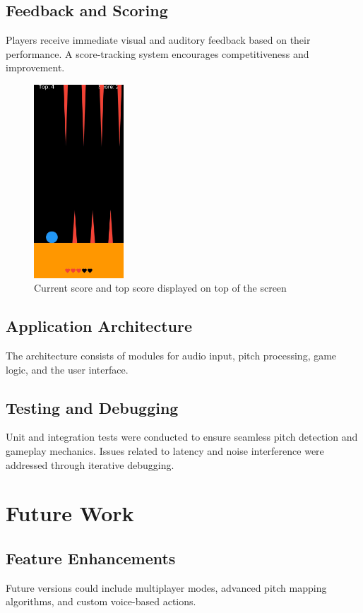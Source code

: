 \documentclass[runningheads]{llncs}
\begin{document}
\newpage
\subsection{Feedback and Scoring}
Players receive immediate visual and auditory feedback based on their performance. A score-tracking system encourages competitiveness and improvement. 
\begin{figure}[h]
    \centering
    \includegraphics[width=0.3\textwidth]{figures/lives.jpg}
    \caption{Current score and top score displayed on top of the screen}
    \label{fig:game_over}
\end{figure}    

\subsection{Application Architecture}
The architecture consists of modules for audio input, pitch processing, game logic, and the user interface. 

\subsection{Testing and Debugging}
Unit and integration tests were conducted to ensure seamless pitch detection and gameplay mechanics. Issues related to latency and noise interference were addressed through iterative debugging.

\section{Future Work}
\subsection{Feature Enhancements}
Future versions could include multiplayer modes, advanced pitch mapping algorithms, and custom voice-based actions.
\end{document}
